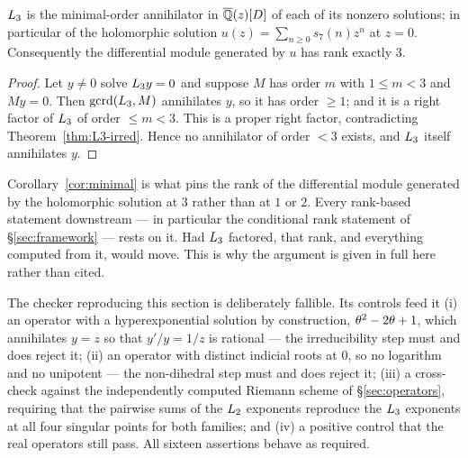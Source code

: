 \begin{corollary}\label{cor:minimal}
$L_3$ is the minimal-order annihilator in $\overline{\mathbb{Q}}(z)[D]$ of each of
its nonzero solutions; in particular of the holomorphic solution
$u(z) = \sum_{n\geq 0}s_7(n)z^n$ at $z=0$. Consequently the differential
module generated by $u$ has rank exactly $3$.
\end{corollary}

\begin{proof}
Let $y\neq 0$ solve $L_3 y = 0$ and suppose $M$ has order $m$ with
$1 \leq m < 3$ and $My = 0$. Then $\operatorname{gcrd}(L_3,M)$
annihilates $y$, so it
has order $\geq 1$; and it is a right factor of $L_3$ of order
$\leq m < 3$. This is a proper right factor, contradicting
Theorem~\ref{thm:L3-irred}. Hence no annihilator of order $<3$ exists, and
$L_3$ itself annihilates $y$.
\end{proof}

\begin{remark}
\label{rem:minimality-load}
Corollary~\ref{cor:minimal} is what pins the rank of the differential module
generated by the holomorphic solution at $3$ rather than at $1$ or $2$. Every
rank-based statement downstream --- in particular the conditional rank
statement of \S\ref{sec:framework} --- rests on it. Had $L_3$ factored,
that rank, and everything computed from it, would move. This is why the
argument is given in full here rather than cited.
\end{remark}

\begin{remark}
The checker reproducing this section is deliberately fallible. Its controls
feed it (i) an operator with a hyperexponential solution by construction,
$\theta^2-2\theta+1$, which annihilates $y = z$ so that $y'/y = 1/z$ is
rational --- the irreducibility step must and does reject it; (ii) an operator
with distinct indicial roots at $0$, so no logarithm and no unipotent --- the
non-dihedral step must and does reject it; (iii) a cross-check against the
independently computed Riemann scheme of \S\ref{sec:operators}, requiring that
the pairwise sums of the $L_2$ exponents reproduce the $L_3$ exponents at
all four singular points for both families; and (iv) a positive control that
the real operators still pass. All sixteen assertions behave as required.
\end{remark}

